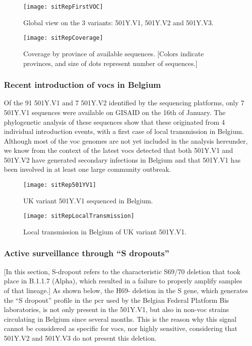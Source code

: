 \begin{figure}[ht]
  \centering
  \texttt{[image: sitRepFirstVOC]}
  \caption[Global view on the 3 variants: 501Y.V1, 501Y.V2 and 501Y.V3]{Global view on the 3 variants: 501Y.V1, 501Y.V2 and 501Y.V3.}
  \label{fig:sitRepFirstVOC}
\end{figure}

\begin{figure}[ht]
  \centering
  \texttt{[image: sitRepCoverage]}
  \caption[Coverage by province of available sequences]{Coverage by province of available sequences. [Colors indicate provinces, and size of dots represent number of sequences.]}
  \label{fig:sitRepCoverage}
\end{figure}

\subsubsection{Recent introduction of \gls{voc}s in Belgium}
Of the 91 501Y.V1 and 7 501Y.V2 identified by the sequencing platforms, only 7 501Y.V1 sequences were available on GISAID on the 16th of January.
The phylogenetic analysis of these sequences show that these originated from 4 individual introduction events, with a first case of local transmission in Belgium.
Although most of the \gls{voc} genomes are not yet included in the analysis hereunder, we know from the context of the latest \gls{voc}s detected that both 501Y.V1 and 501Y.V2 have generated secondary infections in Belgium and that 501Y.V1 has been involved in at least one large community outbreak.

\begin{figure}[ht]
  \centering
  \texttt{[image: sitRep501YV1]}
  \caption[UK variant 501Y.V1 sequenced in Belgium]{UK variant 501Y.V1 sequenced in Belgium.}
  \label{fig:sitRep501YV1}
\end{figure}

\begin{figure}[ht]
  \centering
  \texttt{[image: sitRepLocalTransmission]}
  \caption[Local transmission in Belgium of UK variant 501Y.V1]{Local transmission in Belgium of UK variant 501Y.V1.}
  \label{fig:sitRepLocalTransmission}
\end{figure}

\subsubsection{Active surveillance through ``S dropouts''}
[In this section, S-dropout refers to the characteristic S69/70 deletion that took place in B.1.1.7 (Alpha), which resulted in a failure to properly amplify samples of that lineage.]
As shown below, the H69- deletion in the S gene, which generates the ``S dropout'' profile in the \gls{pcr} used by the Belgian Federal Platform Bis laboratories, is not only present in the 501Y.V1, but also in non-\gls{voc} strains circulating in Belgium since several months.
This is the reason why this signal cannot be considered as specific for \gls{voc}s, nor highly sensitive, considering that 501Y.V2 and 501Y.V3 do not present this deletion.

